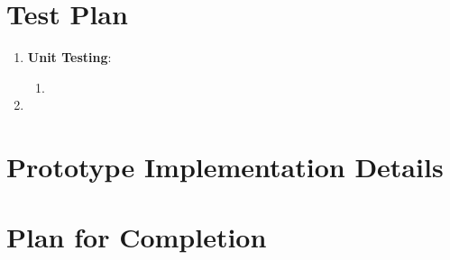 \documentclass{scrreprt}
\begin{document}
\chapter{Test Plan}

\begin{enumerate}
    \item \textbf{Unit Testing}:
    \begin{enumerate}
        \item 
    \end{enumerate}
    \item 
\end{enumerate}






\chapter{Prototype Implementation Details}




\chapter{Plan for Completion}
\end{document}
